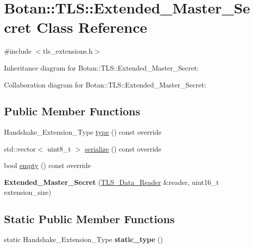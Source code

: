 \hypertarget{class_botan_1_1_t_l_s_1_1_extended___master___secret}{}\section{Botan\+:\+:T\+LS\+:\+:Extended\+\_\+\+Master\+\_\+\+Secret Class Reference}
\label{class_botan_1_1_t_l_s_1_1_extended___master___secret}


{\ttfamily \#include $<$tls\+\_\+extensions.\+h$>$}



Inheritance diagram for Botan\+:\+:T\+LS\+:\+:Extended\+\_\+\+Master\+\_\+\+Secret\+:


Collaboration diagram for Botan\+:\+:T\+LS\+:\+:Extended\+\_\+\+Master\+\_\+\+Secret\+:
\subsection*{Public Member Functions}
\begin{DoxyCompactItemize}
\item 
Handshake\+\_\+\+Extension\+\_\+\+Type \mbox{\hyperlink{class_botan_1_1_t_l_s_1_1_extended___master___secret_a4e0c181be783e0c301c286ffacd682ef}{type}} () const override
\item 
std\+::vector$<$ uint8\+\_\+t $>$ \mbox{\hyperlink{class_botan_1_1_t_l_s_1_1_extended___master___secret_a4665dff15e868d0f9f45d934767d9507}{serialize}} () const override
\item 
bool \mbox{\hyperlink{class_botan_1_1_t_l_s_1_1_extended___master___secret_ab7445933ce793c95ef1576bf35d1154c}{empty}} () const override
\item 
\mbox{\label{class_botan_1_1_t_l_s_1_1_extended___master___secret_a492aa7fb2a0e0104192b1f3403fe4ed7}} 
{\bfseries Extended\+\_\+\+Master\+\_\+\+Secret} (\mbox{\hyperlink{class_botan_1_1_t_l_s_1_1_t_l_s___data___reader}{T\+L\+S\+\_\+\+Data\+\_\+\+Reader}} \&reader, uint16\+\_\+t extension\+\_\+size)
\end{DoxyCompactItemize}
\subsection*{Static Public Member Functions}
\begin{DoxyCompactItemize}
\item 
\mbox{\label{class_botan_1_1_t_l_s_1_1_extended___master___secret_a025b81f11aac69297c1c68d3dd00c9af}} 
static Handshake\+\_\+\+Extension\+\_\+\+Type {\bfseries static\+\_\+type} ()
\end{DoxyCompactItemize}


